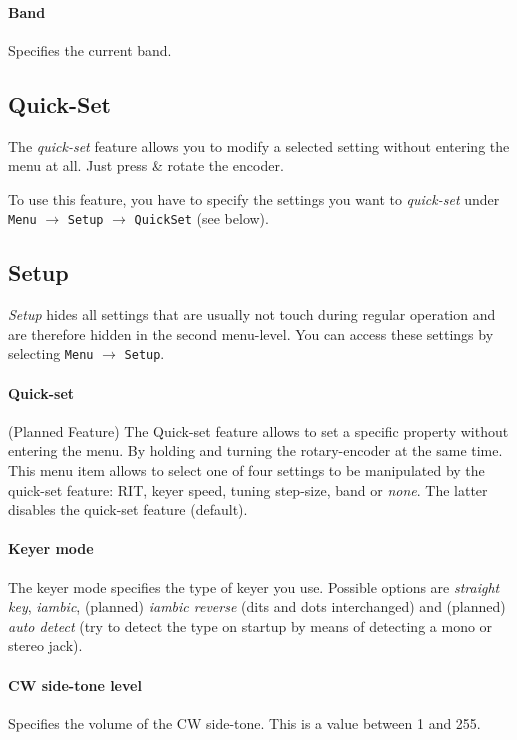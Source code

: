 \documentclass[10pt, a4paper,twoside]{scrartcl}
\begin{document}
\paragraph{Band}
Specifies the current band. 


\subsection{Quick-Set}
The \emph{quick-set} feature allows you to modify a selected setting without entering the menu at all. Just press \& rotate the  encoder.

To use this feature, you have to specify the settings you want to \emph{quick-set} under \texttt{Menu} $\rightarrow$ \texttt{Setup} $\rightarrow$ \texttt{QuickSet} (see below).

\subsection{Setup}
\emph{Setup} hides all settings that are usually not touch during regular operation and are therefore hidden in the second menu-level. You can access these settings by selecting \texttt{Menu} $\rightarrow$ \texttt{Setup}.

\paragraph{Quick-set}
(Planned Feature) The Quick-set feature allows to set a specific property without entering the menu. By holding and turning the rotary-encoder at the same time. This menu item allows to select one of four settings to be manipulated by the quick-set feature: RIT, keyer speed, tuning step-size, band or \emph{none}. The latter disables the quick-set feature (default).

\paragraph{Keyer mode}
The keyer mode specifies the type of keyer you use. Possible options are \emph{straight key}, \emph{iambic}, (planned) \emph{iambic reverse} (dits and dots interchanged) and (planned) \emph{auto detect} (try to detect the type on startup by means of detecting a mono or stereo jack). 

\paragraph{CW side-tone level}
Specifies the volume of the CW side-tone. This is a value between 1 and 255.
\end{document}
